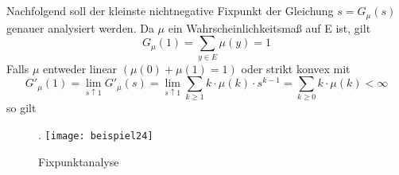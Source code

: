 \\
\\
Nachfolgend soll der kleinste nichtnegative Fixpunkt der Gleichung $s = G_{\mu}(s)$ genauer analysiert werden. Da $\mu$ ein Wahrscheinlichkeitsmaß auf E ist, gilt
\begin{equation*}
G_{\mu}(1) = \sum_{y \in E} \mu(y) = 1
\end{equation*}
Falls $\mu$ entweder linear $(\mu(0) + \mu(1) = 1)$  oder strikt konvex mit
\begin{equation*}
G'_{\mu}(1) = \lim_{s \uparrow 1} G'_{\mu}(s) = \lim_{s \uparrow 1} \sum_{ k \geq 1} k \cdot \mu(k) \cdot s^{k-1} = \sum_{ k \geq 0} k \cdot \mu(k) < \infty
\end{equation*}
so gilt
\begin{figure}[H].
\centering
\texttt{[image: beispiel24]}
\caption{Fixpunktanalyse}
\end{figure}
\noindent